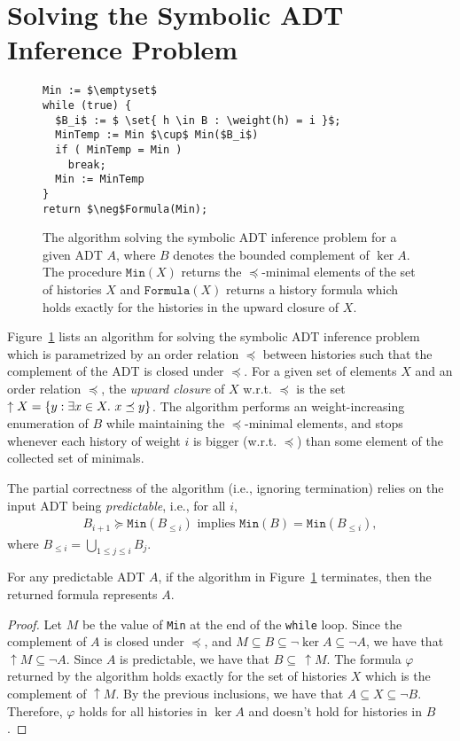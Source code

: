 \section{Solving the Symbolic ADT Inference Problem}
\label{sec:algorithm}

\begin{figure}
\begin{lstlisting}
Min := $\emptyset$
while (true) {
  $B_i$ := $ \set{ h \in B : \weight(h) = i }$;
  MinTemp := Min $\cup$ Min($B_i$)
  if ( MinTemp = Min )
    break;
  Min := MinTemp
}
return $\neg$Formula(Min);
\end{lstlisting}
\caption{The algorithm solving the symbolic ADT inference problem for a given ADT $A$, where $B$ denotes the bounded complement of $\ker A$. The procedure $\texttt{Min}(X)$ returns the $\preceq$-minimal elements of the set of histories $X$ and $\texttt{Formula}(X)$ returns a history formula which holds exactly for the histories in the upward closure of $X$.}
\label{fig:algorithm}
\end{figure}

Figure~\ref{fig:algorithm} lists an algorithm for solving the symbolic ADT inference problem which is parametrized by
an order relation $\preceq$ between histories such that the complement of the ADT
is closed under $\preceq$. For a given set of elements $X$ and an order relation $\preceq$, the \emph{upward closure}
of $X$ w.r.t. $\preceq$ is the set $\uparrow X={\{{y : \exists x\in X.\ x\preceq y}\}}$. The algorithm performs an
weight-increasing enumeration of $B$ while maintaining the
$\preceq$-minimal elements, and stops whenever each history of weight $i$ is bigger (w.r.t. $\preceq$) than some
element of the collected set of minimals.

The partial correctness of the algorithm (i.e., ignoring termination) relies on the input ADT being \emph{predictable}, i.e.,
for all $i$,
\begin{align*}
B_{i+1} \succeq \texttt{Min}(B_{\leq i}) \mbox{ implies } \texttt{Min}(B) = \texttt{Min}(B_{\leq i}),
\end{align*}
where $B_{\leq i}=\bigcup_{1\leq j\leq i}B_j$.

\begin{theorem}\label{th:corr1}
For any predictable ADT $A$, if the algorithm in Figure~\ref{fig:algorithm} terminates, then the returned formula represents $A$.
\end{theorem}
\begin{proof}
Let $M$ be the value of \texttt{Min} at the end of the \texttt{while} loop.
Since the complement of $A$ is closed under $\preceq$, and $M\subseteq B\subseteq  \neg \ker A \subseteq \neg A$, we have that $\uparrow M\subseteq \neg A$.
Since $A$ is predictable, we have that $B \subseteq\, \uparrow M$.
The formula $\varphi$ returned by the algorithm holds exactly for the set of histories $X$
which is the complement of $\uparrow M$. By the previous inclusions, we have that $A\subseteq X\subseteq \neg B$.
Therefore, $\varphi$ holds for all histories in $\ker A$ and doesn't hold for histories in $B$.
\end{proof}

